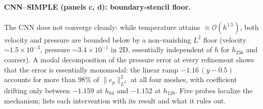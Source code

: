 \paragraph{CNN--SIMPLE (panels c, d): boundary-stencil floor.}
The CNN does not converge cleanly: while temperature attains
$\approx\!\mathcal{O}(h^{1.5})$, both velocity and pressure are bounded
below by a non-vanishing $L^{2}$ floor (velocity $\sim 1.5\times 10^{-3}$,
pressure $\sim 3.4\times 10^{-1}$ in 2D, essentially independent of $h$
for $h_{256}$ and coarser). A modal decomposition of the pressure error at
every refinement shows that the error is essentially monomodal: the
linear ramp $-1.16\,(y - 0.5)$ accounts for more than $98\%$ of
$\|e_{p}\|_{L^{2}}^{2}$ at all four meshes, with coefficient drifting only
between $-1.159$ at $h_{64}$ and $-1.152$ at $h_{128}$. Five probes
localize the mechanism;  lists each intervention with its
result and what it rules out.
